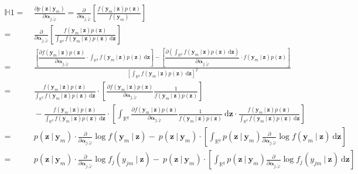 \documentclass[11pt, a4paper]{article}
\newcommand{\R}{{\ensuremath{\mathbb{R}}}}
\newcommand{\cond}{\!~|~\!}
\begin{document}
\begin{align*}
\mathbb{H}1 = & ~ \frac{\partial p(\mathbf{z} \cond \mathbf{y}_m)}{\partial \bm{\alpha}_{j,\tilde{\varphi}}} = \frac{\partial}{\partial \bm{\alpha}_{j,\tilde{\varphi}}} \left[ \frac{f(\mathbf{y}_m \cond \mathbf{z}) p(\mathbf{z})}{f(\mathbf{y}_m)} \right] \\[3mm]
= & ~ \frac{\partial}{\partial \bm{\alpha}_{j,\tilde{\varphi}}} \left[ \frac{f(\mathbf{y}_m \cond \mathbf{z}) p(\mathbf{z})}{\int_{\R^q} f(\mathbf{y}_m \cond \mathbf{z}) p(\mathbf{z})~ \text{d}\mathbf{z}} \right]\\[3mm]
= & ~ \frac{\left[\dfrac{\partial f(\mathbf{y}_m \cond \mathbf{z}) p(\mathbf{z})}{\partial \bm{\alpha}_{j,\tilde{\varphi}}} \cdot \int_{\R^q} f(\mathbf{y}_m \cond \mathbf{z}) p(\mathbf{z}) ~ \text{d}\mathbf{z} \right] - \left[ \dfrac{\partial\left(\int_{\R^q} f(\mathbf{y}_m \cond \mathbf{z}) p(\mathbf{z}) ~ \text{d}\mathbf{z} \right)}{\partial \bm{\alpha}_{j,\tilde{\varphi}}} \cdot f(\mathbf{y}_m \cond \mathbf{z}) p(\mathbf{z}) \right]} {\left[ \int_{\R^q} f(\mathbf{y}_m \cond \mathbf{z}) p(\mathbf{z})~ \text{d}\mathbf{z} \right]^2} \\[3mm]
= & ~ \frac{f(\mathbf{y}_m \cond \mathbf{z}) p(\mathbf{z})}{\int_{\R^q} f(\mathbf{y}_m \cond \mathbf{z}) p(\mathbf{z})~ \text{d}\mathbf{z}} \cdot 
\left[ \frac{\partial f(\mathbf{y}_m \cond \mathbf{z}) p(\mathbf{z})}{\partial \bm{\alpha}_{j,\tilde{\varphi}}} \frac{1}{f(\mathbf{y}_m \cond \mathbf{z}) p(\mathbf{z})} \right]\\[3mm]
& ~ - \frac{f(\mathbf{y}_m \cond \mathbf{z}) p(\mathbf{z})}{\int_{\R^q} f(\mathbf{y}_m \cond \mathbf{z}) p(\mathbf{z})~ \text{d}\mathbf{z}} \cdot 
\left[{\displaystyle \int_{\R^q}} \frac{\partial f(\mathbf{y}_m \cond \mathbf{z}) p(\mathbf{z})}{\partial \bm{\alpha}_{j,\tilde{\varphi}}} \frac{1}{f(\mathbf{y}_m \cond \mathbf{z}) p(\mathbf{z})}~ \text{d}\mathbf{z} \cdot \frac{f(\mathbf{y}_m \cond \mathbf{z}) p(\mathbf{z})}{\int_{\R^q} f(\mathbf{y}_m \cond \mathbf{z}) p(\mathbf{z})~ \text{d}\mathbf{z}} 
\right] \\[3mm]
= & ~ p(\mathbf{z} \cond \mathbf{y}_m) \cdot \frac{\partial}{\partial \bm{\alpha}_{j,\tilde{\varphi}}} \log f(\mathbf{y}_m \cond \mathbf{z}) - ~ p(\mathbf{z} \cond \mathbf{y}_m) \cdot \left[\int_{\R^q} p(\mathbf{z} \cond \mathbf{y}_m) \frac{\partial}{\partial \bm{\alpha}_{j,\tilde{\varphi}}} \log f(\mathbf{y}_m \cond \mathbf{z}) ~\text{d}\mathbf{z} \right] \\[3mm]
= & ~  p(\mathbf{z} \cond \mathbf{y}_m) \cdot \frac{\partial}{\partial \bm{\alpha}_{j,\tilde{\varphi}}} \log f_j(y_{jm} \cond \mathbf{z}) - ~ p(\mathbf{z} \cond \mathbf{y}_m) \cdot \left[\int_{\R^q} p(\mathbf{z} \cond \mathbf{y}_m) \frac{\partial}{\partial \bm{\alpha}_{j,\tilde{\varphi}}} \log f_j(y_{jm} \cond \mathbf{z}) ~\text{d}\mathbf{z} \right]
\end{align*}
\end{document}
